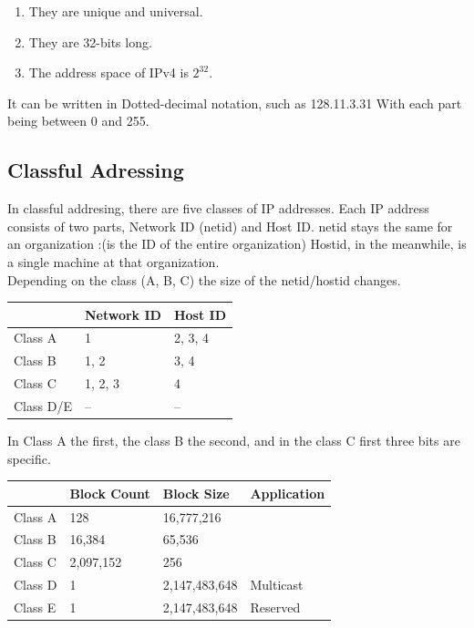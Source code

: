 \documentclass[11pt,a4paper,twoside]{book}
\begin{document}
\begin{enumerate}
\item They are unique and universal.
\item They are 32-bits long.
\item The address space of IPv4 is $2^{32}$.
\end{enumerate}

It can be written in Dotted-decimal notation, such as 128.11.3.31 With each part being between 0 and 255.\\

\subsection{Classful Adressing}

In classful addresing, there are five classes of IP addresses. Each IP address consists of two parts, Network ID (netid) and Host ID. netid stays the same for an organization :(is the ID of the entire organization) Hostid, in the meanwhile, is a single machine at that organization.\\

Depending on the class (A, B, C) the size of the netid/hostid changes.

\begin{table}
\begin{tabular}{lll}
\toprule
& Network ID & Host ID \\
\midrule
Class A & 1 &  2, 3, 4\\
Class B & 1, 2 & 3, 4 \\ 
Class C & 1, 2, 3 & 4 \\
Class D/E & -- & -- \\
\bottomrule
\end{tabular}
\end{table}

In Class A the first, the class B the second, and in the class C first three bits are specific.

\begin{table}
\begin{tabular}{llll}
\toprule
& Block Count & Block Size & Application \\
\midrule
Class A & 128 &  16,777,216\\
Class B & 16,384 &  65,536 \\ 
Class C & 2,097,152 & 256 \\
Class D & 1 &  2,147,483,648 & Multicast\\
Class E & 1 & 2,147,483,648 & Reserved\\
\bottomrule
\end{tabular}
\end{table}
\end{document}

